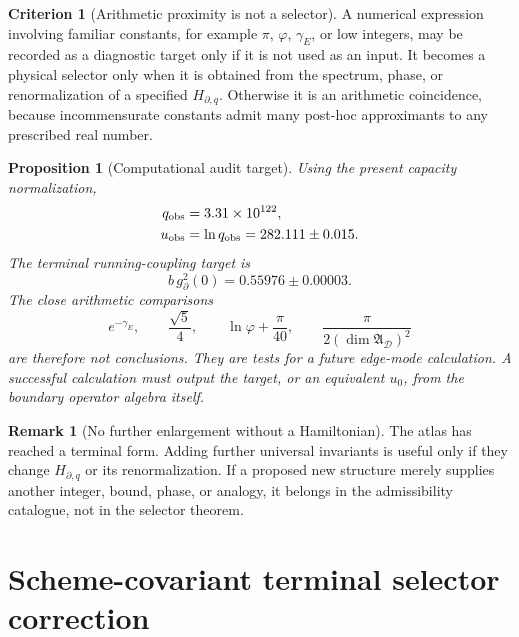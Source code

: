 \documentclass[aps,prd,reprint,nofootinbib,superscriptaddress,floatfix]{revtex4-2}
\numberwithin{equation}{section}
\theoremstyle{definition}
\newtheorem{criterion}{Criterion}[section]
\newtheorem{remark}{Remark}[section]
\theoremstyle{plain}
\newtheorem{proposition}{Proposition}[section]
\begin{document}
\begin{criterion}[Arithmetic proximity is not a selector]\label{crit:arith-proximity}
A numerical expression involving familiar constants, for example
\(\pi\), \(\varphi\), \(\gamma_E\), or low integers, may be recorded as a
diagnostic target only if it is not used as an input.  It becomes a
physical selector only when it is obtained from the spectrum, phase, or
renormalization of a specified \(H_{\partial,q}\).  Otherwise it is an
arithmetic coincidence, because incommensurate constants admit many
post-hoc approximants to any prescribed real number.
\end{criterion}

\begin{proposition}[Computational audit target]\label{prop:terminal-coupling-target}
Using the present capacity normalization,
\begin{align}
        q_{\rm obs}&=3.31\times 10^{122},\\
        u_{\rm obs}&=\ln q_{\rm obs}=282.111\pm0.015 .
\end{align}
The terminal running-coupling target is
\begin{equation}
\boxed{
        b\,g_\partial^2(0)
        =
        0.55976\pm0.00003 .
}
\end{equation}
The close arithmetic comparisons
\begin{equation}
        e^{-\gamma_E},\qquad
        \frac{\sqrt5}{4},\qquad
        \ln\varphi+\frac{\pi}{40},
        \qquad
        \frac{\pi}{2(\dim\mathfrak A_{\mathscr D})^2}
\end{equation}
are therefore not conclusions.  They are tests for a future edge-mode
calculation.  A successful calculation must output the target, or an
equivalent \(u_0\), from the boundary operator algebra itself.
\end{proposition}

\begin{remark}[No further enlargement without a Hamiltonian]
The atlas has reached a terminal form.  Adding further universal
invariants is useful only if they change \(H_{\partial,q}\) or its
renormalization.  If a proposed new structure merely supplies another
integer, bound, phase, or analogy, it belongs in the admissibility
catalogue, not in the selector theorem.
\end{remark}





\section{Scheme-covariant terminal selector correction}\label{sec:scheme-covariant-terminal-correction}
\end{document}
